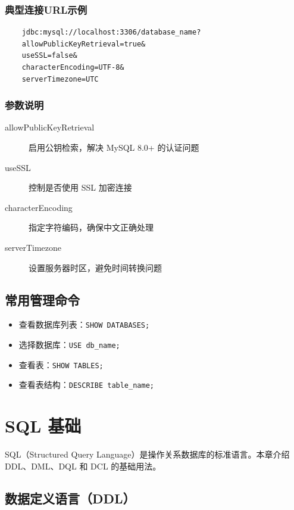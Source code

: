 \documentclass[12pt,UTF8]{ctexbook}
\begin{document}
\subsection{典型连接URL示例}

\begin{verbatim}
	jdbc:mysql://localhost:3306/database_name?
	allowPublicKeyRetrieval=true&
	useSSL=false&
	characterEncoding=UTF-8&
	serverTimezone=UTC
\end{verbatim}

\subsection{参数说明}

\begin{description}
	\item[allowPublicKeyRetrieval] 启用公钥检索，解决 MySQL 8.0+ 的认证问题
	\item[useSSL] 控制是否使用 SSL 加密连接
	\item[characterEncoding] 指定字符编码，确保中文正确处理
	\item[serverTimezone] 设置服务器时区，避免时间转换问题
\end{description}

\section{常用管理命令}

\begin{itemize}
  \item 查看数据库列表：\texttt{SHOW DATABASES;}
  \item 选择数据库：\texttt{USE db\_name;}
  \item 查看表：\texttt{SHOW TABLES;}
  \item 查看表结构：\texttt{DESCRIBE table\_name;}
\end{itemize}

\chapter{SQL 基础}
\label{ch:sql_basic}

SQL（Structured Query Language）是操作关系数据库的标准语言。本章介绍 DDL、DML、DQL 和 DCL 的基础用法。

\section{数据定义语言（DDL）}
\end{document}
